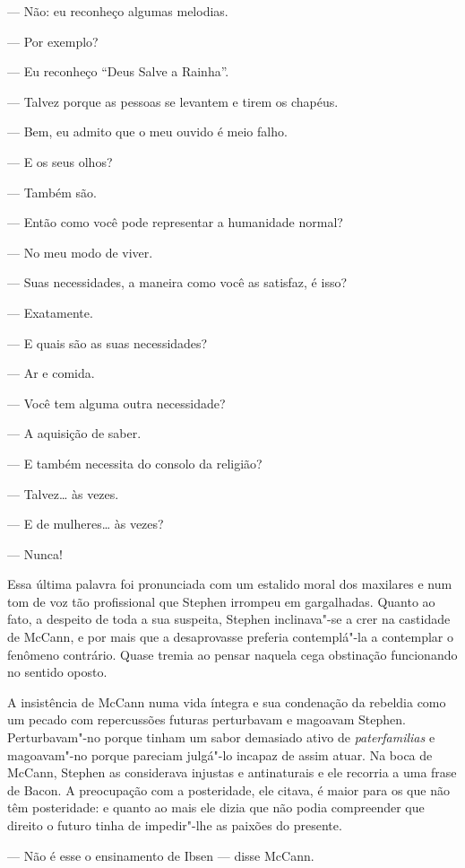 --- Não: eu reconheço algumas melodias.

--- Por exemplo?

--- Eu reconheço “Deus Salve a Rainha”.

--- Talvez porque as pessoas se levantem e tirem os chapéus.

--- Bem, eu admito que o meu ouvido é meio falho.

--- E os seus olhos?

--- Também são.

--- Então como você pode representar a humanidade normal?

--- No meu modo de viver.

--- Suas necessidades, a maneira como você as satisfaz, é
isso?

--- Exatamente.

--- E quais são as suas necessidades?

--- Ar e comida.

--- Você tem alguma outra necessidade?

--- A aquisição de saber.

--- E também necessita do consolo da religião?

--- Talvez\ldots{} às vezes.

--- E de mulheres\ldots{} às vezes?

--- Nunca!

Essa última palavra foi pronunciada com um estalido moral dos
maxilares e num tom de voz tão profissional que Stephen irrompeu em
gargalhadas.  Quanto ao fato, a despeito de toda a sua suspeita,
Stephen inclinava"-se a crer na castidade de McCann, e por mais que a
desaprovasse preferia contemplá"-la a contemplar o fenômeno contrário.
Quase tremia ao pensar naquela cega obstinação funcionando no sentido
oposto.

A insistência de McCann numa vida íntegra e sua condenação da
rebeldia como um pecado com repercussões futuras perturbavam e magoavam
Stephen.  Perturbavam"-no porque tinham um sabor demasiado ativo de
\textit{paterfamilias} e magoavam"-no porque pareciam julgá"-lo incapaz
de assim atuar.  Na boca de McCann, Stephen as considerava injustas e
antinaturais e ele recorria a uma frase de Bacon.  A preocupação com a
posteridade, ele citava, é maior para os que não têm posteridade: e
quanto ao mais ele dizia que \label{nao"-podia} não podia compreender que direito o
futuro tinha de impedir"-lhe as paixões do presente.

--- Não é esse o ensinamento de Ibsen --- disse McCann.

